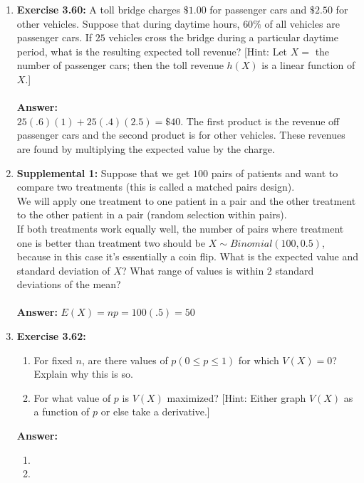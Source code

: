 \documentclass[12pt]{article}
\theoremstyle{homework}
\begin{document}
\begin{enumerate}
\item\hspace{.5in}\textbf{Exercise 3.60:} A toll bridge charges $\$1.00$ for passenger cars and $\$2.50$ for other vehicles. Suppose that during daytime hours, $60\%$ of all vehicles are passenger cars. If $25$ vehicles cross the bridge during a particular daytime period, what is the resulting expected toll revenue? [Hint: Let $X= $ the number of passenger cars; then the toll revenue $h(X)$ is a linear function of $X$.]\\
\\
\textbf{Answer:} \\
$25(.6)(1)+25(.4)(2.5)=\$40$. The first product is the revenue off passenger cars and the second product is for other vehicles. These revenues are found by multiplying the expected value by the charge.
\vspace{.5in}

\item\hspace{.5in}\textbf{Supplemental 1:} Suppose that we get $100$ pairs of patients and want to compare two treatments (this is called a matched pairs design).\\

We will apply one treatment to one patient in a pair and the other treatment to the other patient in a pair (random selection within pairs).\\

If both treatments work equally well, the number of pairs where treatment one is better than treatment two should be $X \sim Binomial(100,0.5)$, because in this case it’s essentially a coin flip. What is the expected value and standard deviation of $X$? What range of values is within $2$ standard deviations of the mean?\\
\\
\textbf{Answer:} 
$E(X)=np=100(.5)=50$\\
\vspace{.5in}

\item\hspace{.5in}\textbf{Exercise 3.62:}
\begin{enumerate}
\item For fixed $n$, are there values of $p(0 \le p \le 1)$ for which $V(X) = 0$? Explain why this is so.
\item For what value of $p$ is $V(X)$ maximized? [Hint: Either graph $V(X)$ as a function of $p$ or else take a derivative.]
\end{enumerate}
\textbf{Answer:} 
\begin{enumerate}
\item
\item
\end{enumerate}
\vspace{.5in}

\end{enumerate}
\end{document}
